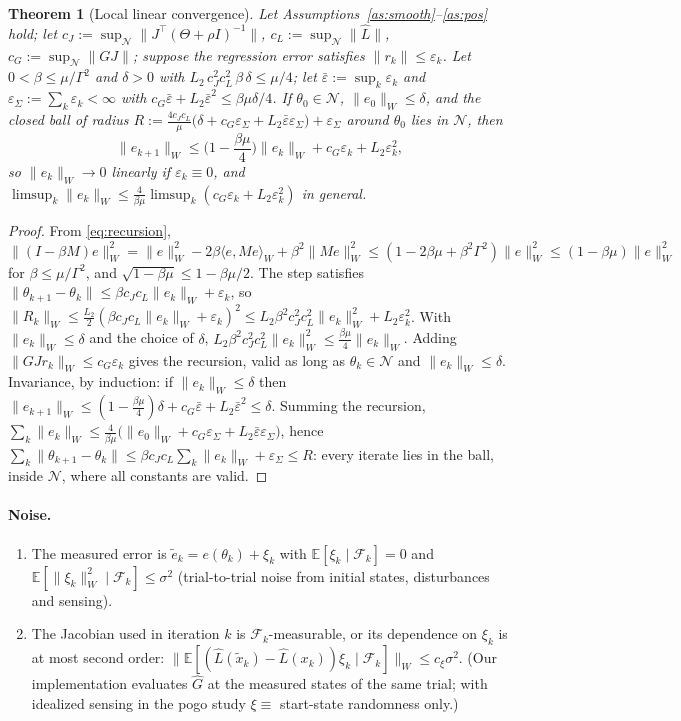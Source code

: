 \documentclass[11pt]{article}
\newtheorem{theorem}{Theorem}
\theoremstyle{definition}
\theoremstyle{remark}
\newcommand{\E}{\mathbb{E}}
\newcommand{\cN}{\mathcal{N}}
\newcommand{\cF}{\mathcal{F}}
\newcommand{\ip}[2]{\langle #1,#2\rangle_W}
\newcommand{\nW}[1]{\lVert #1\rVert_W}
\newcommand{\n}[1]{\lVert #1\rVert}
\newcommand{\Ghat}{\widehat G}
\newcommand{\Lhat}{\widehat L}
\begin{document}
\begin{theorem}[Local linear convergence]\label{thm:local}
Let Assumptions~\ref{as:smooth}--\ref{as:pos} hold; let $c_J:=\sup_{\cN}\n{J^\top(\Theta+\rho I)^{-1}}$,
$c_L:=\sup_\cN\n{\Lhat}$, $c_G:=\sup_{\cN}\n{GJ}$; suppose the regression error satisfies $\n{r_k}\le\varepsilon_k$.
Let $0<\beta\le\mu/\Gamma^2$ and $\delta>0$ with $L_2\,c_J^2c_L^2\,\beta\,\delta\le\mu/4$; let
$\bar\varepsilon:=\sup_k\varepsilon_k$ and $\varepsilon_\Sigma:=\sum_k\varepsilon_k<\infty$ with
$c_G\bar\varepsilon+L_2\bar\varepsilon^2\le\beta\mu\delta/4$. If $\theta_0\in\cN$, $\nW{e_0}\le\delta$, and the closed
ball of radius $R:=\tfrac{4c_Jc_L}{\mu}\big(\delta+c_G\varepsilon_\Sigma+L_2\bar\varepsilon\varepsilon_\Sigma\big)+
\varepsilon_\Sigma$ around $\theta_0$ lies in $\cN$, then
\[\nW{e_{k+1}}\le\Big(1-\frac{\beta\mu}{4}\Big)\nW{e_k}+c_G\varepsilon_k+L_2\varepsilon_k^2,\]
so $\nW{e_k}\to0$ linearly if $\varepsilon_k\equiv0$, and $\limsup_k\nW{e_k}\le\frac{4}{\beta\mu}\limsup_k
(c_G\varepsilon_k+L_2\varepsilon_k^2)$ in general.
\end{theorem}
\begin{proof}
From \eqref{eq:recursion}, $\nW{(I-\beta M)e}^2=\nW e^2-2\beta\ip{e}{Me}+\beta^2\nW{Me}^2\le(1-2\beta\mu+\beta^2
\Gamma^2)\nW e^2\le(1-\beta\mu)\nW e^2$ for $\beta\le\mu/\Gamma^2$, and $\sqrt{1-\beta\mu}\le1-\beta\mu/2$.
The step satisfies $\n{\theta_{k+1}-\theta_k}\le\beta c_Jc_L\nW{e_k}+\varepsilon_k$, so
$\nW{R_k}\le\tfrac{L_2}{2}(\beta c_Jc_L\nW{e_k}+\varepsilon_k)^2\le L_2\beta^2c_J^2c_L^2\nW{e_k}^2+L_2\varepsilon_k^2$.
With $\nW{e_k}\le\delta$ and the choice of $\delta$, $L_2\beta^2c_J^2c_L^2\nW{e_k}^2\le\tfrac{\beta\mu}{4}\nW{e_k}$.
Adding $\nW{GJr_k}\le c_G\varepsilon_k$ gives the recursion, valid as long as $\theta_k\in\cN$ and
$\nW{e_k}\le\delta$. Invariance, by induction: if $\nW{e_k}\le\delta$ then
$\nW{e_{k+1}}\le(1-\tfrac{\beta\mu}4)\delta+c_G\bar\varepsilon+L_2\bar\varepsilon^2\le\delta$. Summing the recursion,
$\sum_k\nW{e_k}\le\frac{4}{\beta\mu}\big(\nW{e_0}+c_G\varepsilon_\Sigma+L_2\bar\varepsilon\varepsilon_\Sigma\big)$, hence
$\sum_k\n{\theta_{k+1}-\theta_k}\le\beta c_Jc_L\sum_k\nW{e_k}+\varepsilon_\Sigma\le R$: every iterate lies in the ball,
inside $\cN$, where all constants are valid.
\end{proof}

\paragraph{Noise.}
\begin{enumerate}[label=(N\arabic*),leftmargin=3em]
\item The measured error is $\tilde e_k=e(\theta_k)+\xi_k$ with $\E[\xi_k\mid\cF_k]=0$ and
  $\E[\nW{\xi_k}^2\mid\cF_k]\le\sigma^2$ (trial-to-trial noise from initial states, disturbances and sensing).
\item The Jacobian used in iteration $k$ is $\cF_k$-measurable, or its dependence on $\xi_k$ is at most second order:
  $\nW{\E[(\Lhat(\tilde x_k)-\Lhat(x_k))\xi_k\mid\cF_k]}\le c_\xi\sigma^2$. (Our implementation evaluates $\Ghat$ at the
  measured states of the same trial; with idealized sensing in the pogo study $\xi\equiv$ start-state randomness only.)
\end{enumerate}
\end{document}
